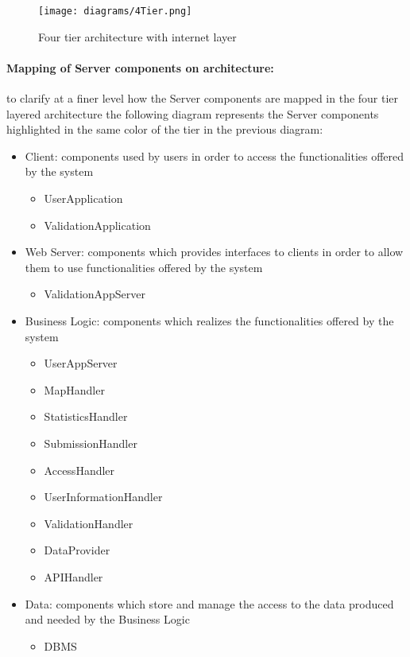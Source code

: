 \begin{figure}[h!]
	\centering
	\texttt{[image: diagrams/4Tier.png]}
	\caption{
		\label{fig:fourTierCloud} 
		Four tier architecture with internet layer
	}
\end{figure}

\paragraph{Mapping of Server components on architecture:}to clarify at a finer level how the Server components are mapped in the four tier layered architecture the following diagram represents the Server components highlighted in the same color of the tier in the previous diagram:
\begin{itemize}
	\item Client: components used by users in order to access the functionalities offered by the system
		\begin{itemize}
			\item UserApplication
			\item ValidationApplication
		\end{itemize}
	\item Web Server: components which provides interfaces to clients in order to allow them to use functionalities offered by the system
		\begin{itemize}
			\item ValidationAppServer
		\end{itemize}
	\item Business Logic: components which realizes the functionalities offered by the system
		\begin{itemize}
			\item UserAppServer
			\item MapHandler
			\item StatisticsHandler
			\item SubmissionHandler
			\item AccessHandler
			\item UserInformationHandler
			\item ValidationHandler
			\item DataProvider
			\item APIHandler
		\end{itemize}
	\item Data: components which store and manage the access to the data produced and needed by the Business Logic
		\begin{itemize}
			\item DBMS \newline\newline
		\end{itemize}
\end{itemize}

